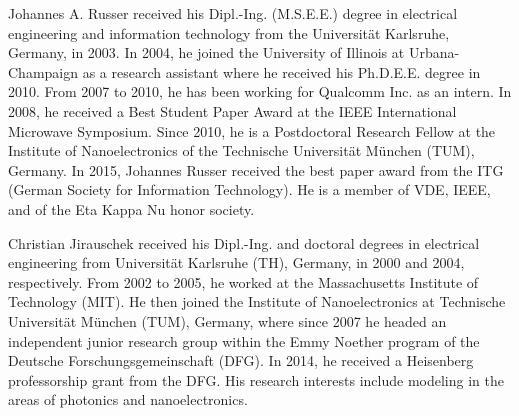 \documentclass[journal]{IEEEtran}
\begin{document}
%
%
\begin{IEEEbiography}
{Johannes A. Russer} received his Dipl.-Ing. (M.S.E.E.) degree in electrical engineering and information technology from the Universit\"at Karlsruhe, Germany, in 2003. In 2004, he joined the University of Illinois at Urbana-Champaign as a research assistant where he received his Ph.D.E.E. degree in 2010. From 2007 to 2010, he has been working for Qualcomm Inc. as
an intern. In 2008, he received a Best Student Paper Award at the IEEE International Microwave Symposium. Since 2010, he is a Postdoctoral Research Fellow at the Institute of Nanoelectronics of the Technische Universit\"at M\"unchen (TUM), Germany. In 2015, Johannes Russer received the best paper award from the ITG (German Society for Information Technology). He is a member of VDE, IEEE, and of the Eta Kappa Nu honor society.
\end{IEEEbiography}
%
%
\begin{IEEEbiography}
   {Christian Jirauschek} received his Dipl.-Ing. and doctoral degrees in electrical engineering from Universit\"at Karlsruhe (TH), Germany, in 2000 and 2004, respectively. From 2002 to 2005, he worked at the Massachusetts Institute of Technology (MIT). He then joined the Institute of Nanoelectronics at Technische Universit\"at M\"unchen (TUM), Germany, where since 2007 he headed an independent junior research group within the Emmy Noether program of the Deutsche Forschungsgemeinschaft (DFG). In 2014, he received a Heisenberg professorship grant from the DFG. His research interests include modeling in the areas of photonics and nanoelectronics.
\end{IEEEbiography}
\end{document}
